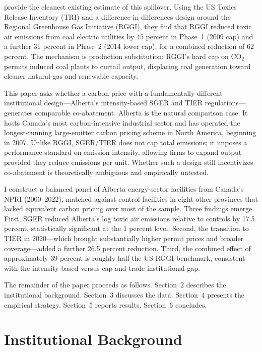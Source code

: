 \documentclass[12pt]{article}
\begin{document}
\citet{pham2024} provide the cleanest existing estimate of this spillover.
Using the US Toxics Release Inventory (TRI) and a difference-in-differences
design around the Regional Greenhouse Gas Initiative (RGGI), they find that
RGGI reduced toxic air emissions from coal electric utilities by 45 percent
in Phase~1 (2009 cap) and a further 31 percent in Phase~2 (2014 lower cap),
for a combined reduction of 62 percent.
The mechanism is production substitution: RGGI's hard cap on CO$_2$
permits induced coal plants to curtail output, displacing coal generation
toward cleaner natural-gas and renewable capacity.

This paper asks whether a carbon price with a fundamentally different
institutional design---Alberta's intensity-based SGER and TIER
regulations---generates comparable co-abatement.
Alberta is the natural comparison case.
It hosts Canada's most carbon-intensive industrial sector and has operated
the longest-running large-emitter carbon pricing scheme in North America,
beginning in 2007.
Unlike RGGI, SGER/TIER does not cap total emissions; it imposes a
performance standard on emission intensity, allowing firms to expand
output provided they reduce emissions per unit.
Whether such a design still incentivizes co-abatement is theoretically
ambiguous and empirically untested.

I construct a balanced panel of Alberta energy-sector facilities from
Canada's NPRI (2000--2022), matched against control facilities in eight
other provinces that lacked equivalent carbon pricing over most of the
sample.
Three findings emerge.
First, SGER reduced Alberta's log toxic air emissions relative to controls
by 17.5 percent, statistically significant at the 1 percent level.
Second, the transition to TIER in 2020---which brought substantially higher
permit prices and broader coverage---added a further 26.5 percent reduction.
Third, the combined effect of approximately 39 percent is roughly half the
US RGGI benchmark, consistent with the intensity-based versus cap-and-trade
institutional gap.

The remainder of the paper proceeds as follows.
Section~2 describes the institutional background.
Section~3 discusses the data.
Section~4 presents the empirical strategy.
Section~5 reports results.
Section~6 concludes.

\section{Institutional Background}
\end{document}
